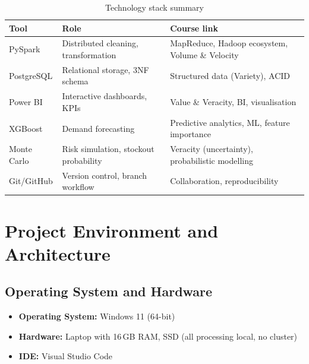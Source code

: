 \documentclass[12pt, a4paper]{report}
\newcommand{\altrows}{\rowcolors{2}{lightbg}{white}}
\begin{document}
\begin{table}[H]
   \centering
   \renewcommand{\arraystretch}{1.3}
   \altrows
   \small
   \caption{Technology stack summary}
   \label{tab:techstack}
   \begin{tabular}{@{}lll@{}}
      \toprule
      Tool & Role & Course link \\
      \midrule
      PySpark & Distributed cleaning, transformation & MapReduce, Hadoop ecosystem, Volume \& Velocity \\
      PostgreSQL & Relational storage, 3NF schema & Structured data (Variety), ACID \\
      Power BI & Interactive dashboards, KPIs & Value \& Veracity, BI, visualisation \\
      XGBoost & Demand forecasting & Predictive analytics, ML, feature importance \\
      Monte Carlo & Risk simulation, stockout probability & Veracity (uncertainty), probabilistic modelling \\
      Git/GitHub & Version control, branch workflow & Collaboration, reproducibility \\
      \bottomrule
   \end{tabular}
\end{table}

\chapter{Project Environment and Architecture}

\section{Operating System and Hardware}
\begin{itemize}[noitemsep, topsep=0pt]
   \item \textbf{Operating System:} Windows 11 (64-bit)
   \item \textbf{Hardware:} Laptop with 16 GB RAM, SSD (all processing local, no cluster)
   \item \textbf{IDE:} Visual Studio Code
\end{itemize}
\end{document}
